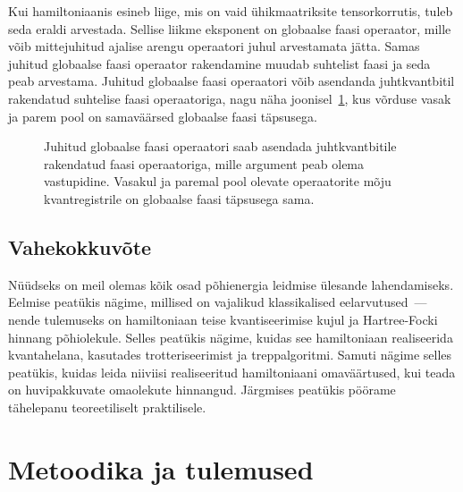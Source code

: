 \documentclass[12pt]{report}
\begin{document}
Kui hamiltoniaanis esineb liige, mis on vaid ühikmaatriksite tensorkorrutis, tuleb seda eraldi arvestada.
Sellise liikme eksponent on globaalse faasi operaator, mille võib mittejuhitud ajalise arengu operaatori juhul arvestamata jätta.
Samas juhitud globaalse faasi operaator rakendamine muudab suhtelist faasi ja seda peab arvestama.
Juhitud globaalse faasi operaatori võib asendanda juhtkvantbitil rakendatud suhtelise faasi operaatoriga, nagu näha joonisel~\ref{fig:globphase}, kus võrduse vasak ja parem pool on samaväärsed globaalse faasi täpsusega.

\begin{figure}[h]
    \centering
    \ifdefined\yquanton
    \fi
    \caption{Juhitud globaalse faasi operaatori saab asendada juhtkvantbitile rakendatud faasi operaatoriga, mille argument peab olema vastupidine. Vasakul ja paremal pool olevate operaatorite mõju kvantregistrile on globaalse faasi täpsusega sama.}
    \label{fig:globphase}
\end{figure}

\section{Vahekokkuvõte}

Nüüdseks on meil olemas kõik osad põhienergia leidmise ülesande lahendamiseks.
Eelmise peatükis nägime, millised on vajalikud klassikalised eelarvutused~--- nende tulemuseks on hamiltoniaan teise kvantiseerimise kujul ja Hartree-Focki hinnang põhiolekule.
Selles peatükis nägime, kuidas see hamiltoniaan realiseerida kvantahelana, kasutades trotteriseerimist ja treppalgoritmi.
Samuti nägime selles peatükis, kuidas leida niiviisi realiseeritud hamiltoniaani omaväärtused, kui teada on huvipakkuvate omaolekute hinnangud.
Järgmises peatükis pöörame tähelepanu teoreetiliselt praktilisele.

\chapter{Metoodika ja tulemused}\label{chap:results}
\end{document}
